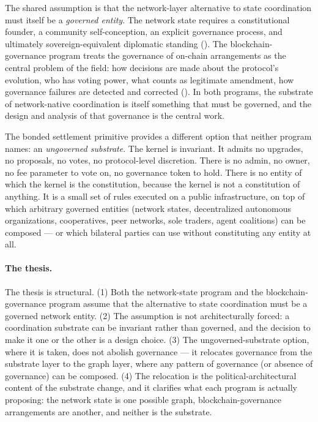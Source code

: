 \documentclass[11pt,a4paper]{article}
\theoremstyle{remark}
\begin{document}
The shared assumption is that the network-layer alternative to
state coordination must itself be a \emph{governed entity}. The
network state requires a constitutional founder, a community
self-conception, an explicit governance process, and ultimately
sovereign-equivalent diplomatic standing
(\citealt{srinivasan2022network}). The blockchain-governance
program treats the governance of on-chain arrangements as the
central problem of the field: how decisions are made about the
protocol's evolution, who has voting power, what counts as
legitimate amendment, how governance failures are detected and
corrected (\citealt{defilippi_mannan_reijers_2022}). In both
programs, the substrate of network-native coordination is
itself something that must be governed, and the design and
analysis of that governance is the central work.

The bonded settlement primitive provides a different option that
neither program names: an \emph{ungoverned substrate}. The
kernel is invariant. It admits no upgrades, no proposals, no
votes, no protocol-level discretion. There is no admin, no
owner, no fee parameter to vote on, no governance token to
hold. There is no entity of which the kernel is the
constitution, because the kernel is not a constitution of
anything. It is a small set of rules executed on a public
infrastructure, on top of which arbitrary governed entities
(network states, decentralized autonomous organizations,
cooperatives, peer networks, sole traders, agent coalitions)
can be composed --- or which bilateral parties can use without
constituting any entity at all.

\paragraph{The thesis.}
The thesis is structural. (1) Both the network-state program and
the blockchain-governance program assume that the alternative to
state coordination must be a governed network entity. (2) The
assumption is not architecturally forced: a coordination
substrate can be invariant rather than governed, and the
decision to make it one or the other is a design choice. (3) The
ungoverned-substrate option, where it is taken, does not abolish
governance --- it relocates governance from the substrate layer
to the graph layer, where any pattern of governance (or absence
of governance) can be composed. (4) The relocation is the
political-architectural content of the substrate change, and it
clarifies what each program is actually proposing: the network
state is one possible graph, blockchain-governance arrangements
are another, and neither is the substrate.
\end{document}
